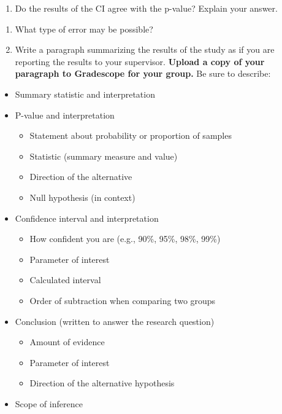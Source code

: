 \documentclass[
]{report}
\providecommand{\tightlist}{%
  \setlength{\itemsep}{0pt}\setlength{\parskip}{0pt}}
\begin{document}
\vspace{0.5in}

\begin{enumerate}
\def\labelenumi{\arabic{enumi}.}
\setcounter{enumi}{14}
\tightlist
\item
  Do the results of the CI agree with the p-value? Explain your answer.
\end{enumerate}

\vspace{0.5in}

\begin{enumerate}
\def\labelenumi{\arabic{enumi}.}
\setcounter{enumi}{15}
\item
  What type of error may be possible?
  \vspace{0.2in}
\item
  Write a paragraph summarizing the results of the study as if you are reporting the results to your supervisor. \textbf{Upload a copy of your paragraph to Gradescope for your group.} Be sure to describe:
\end{enumerate}

\begin{itemize}
\item
  Summary statistic and interpretation
\item
  P-value and interpretation

  \begin{itemize}
  \item
    Statement about probability or proportion of samples
  \item
    Statistic (summary measure and value)
  \item
    Direction of the alternative
  \item
    Null hypothesis (in context)
  \end{itemize}
\item
  Confidence interval and interpretation

  \begin{itemize}
  \item
    How confident you are (e.g., 90\%, 95\%, 98\%, 99\%)
  \item
    Parameter of interest
  \item
    Calculated interval
  \item
    Order of subtraction when comparing two groups
  \end{itemize}
\item
  Conclusion (written to answer the research question)

  \begin{itemize}
  \item
    Amount of evidence
  \item
    Parameter of interest
  \item
    Direction of the alternative hypothesis
  \end{itemize}
\item
  Scope of inference
\end{itemize}
\end{document}
